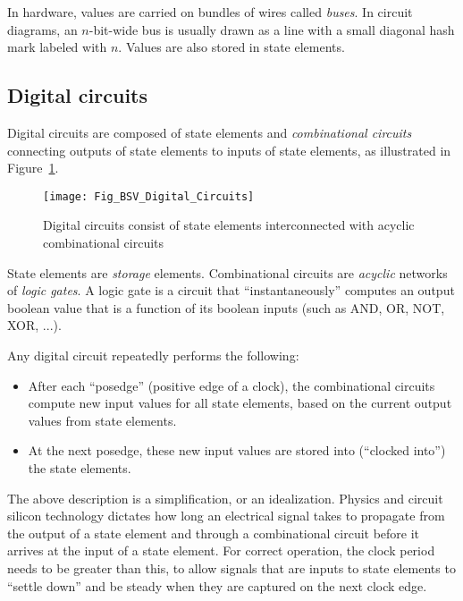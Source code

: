 In hardware, values are carried on bundles of wires called
\emph{buses}.  In circuit diagrams, an $n$-bit-wide bus is usually
drawn as a line with a small diagonal hash mark labeled with $n$.
Values are also stored in state elements.


\subsection{Digital circuits}


Digital circuits are composed of state elements and
\emph{combinational circuits} connecting outputs of state elements to
inputs of state elements, as illustrated in
Figure~\ref{Fig_BSV_Digital_Circuits}.
\begin{figure}[htbp]
  \centerline{\texttt{[image: Fig\_BSV\_Digital\_Circuits]}}
  \caption{\label{Fig_BSV_Digital_Circuits}
           Digital circuits consist of state elements interconnected
	   with acyclic combinational circuits}
\end{figure}

State elements are \emph{storage} elements.  Combinational circuits
are \emph{acyclic} networks of \emph{logic gates}.  A logic gate is a
circuit that ``instantaneously'' computes an output boolean value that
is a function of its boolean inputs (such as AND, OR, NOT, XOR, ...).

Any digital circuit repeatedly performs the following:

\begin{itemize}

\item After each ``posedge'' (positive edge of a clock), the
      combinational circuits compute new input values for all state
      elements, based on the current output values from state elements.

\item At the next posedge, these new input values are stored into
      (``clocked into'') the state elements.

\end{itemize}

The above description is a simplification, or an idealization.
Physics and circuit silicon technology dictates how long an electrical
signal takes to propagate from the output of a state element and
through a combinational circuit before it arrives at the input of a
state element.  For correct operation, the clock period needs to be
greater than this, to allow signals that are inputs to state elements
to ``settle down'' and be steady when they are captured on the next
clock edge.

